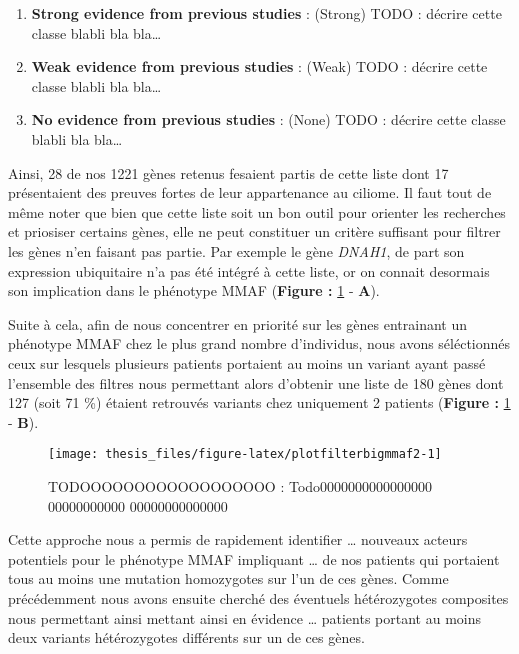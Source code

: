 \documentclass[12pt,twoside]{reedthesis}
\providecommand{\tightlist}{%
  \setlength{\itemsep}{0pt}\setlength{\parskip}{0pt}}
\theoremstyle{definition}
\theoremstyle{definition}
\theoremstyle{remark}
\begin{document}
  \begin{enumerate}
  \def\labelenumi{\arabic{enumi}.}
  \tightlist
  \item
    \textbf{Strong evidence from previous studies} : (Strong) TODO :
    décrire cette classe blabli bla bla\ldots{}\\
  \item
    \textbf{Weak evidence from previous studies} : (Weak) TODO : décrire
    cette classe blabli bla bla\ldots{}\\
  \item
    \textbf{No evidence from previous studies} : (None) TODO : décrire
    cette classe blabli bla bla\ldots{}
  \end{enumerate}
  
  Ainsi, 28 de nos 1221 gènes retenus fesaient partis de cette liste dont
  17 présentaient des preuves fortes de leur appartenance au ciliome. Il
  faut tout de même noter que bien que cette liste soit un bon outil pour
  orienter les recherches et priosiser certains gènes, elle ne peut
  constituer un critère suffisant pour filtrer les gènes n'en faisant pas
  partie. Par exemple le gène \emph{DNAH1}, de part son expression
  ubiquitaire n'a pas été intégré à cette liste, or on connait desormais
  son implication dans le phénotype MMAF (\textbf{Figure :
  }\ref{fig:plotfilterbigmmaf2} - \textbf{A}).
  
  Suite à cela, afin de nous concentrer en priorité sur les gènes
  entrainant un phénotype MMAF chez le plus grand nombre d'individus, nous
  avons séléctionnés ceux sur lesquels plusieurs patients portaient au
  moins un variant ayant passé l'ensemble des filtres nous permettant
  alors d'obtenir une liste de 180 gènes dont 127 (soit 71 \%) étaient
  retrouvés variants chez uniquement 2 patients (\textbf{Figure :
  }\ref{fig:plotfilterbigmmaf2} - \textbf{B}).
  
  \newpage
  
  \begin{figure}
  
  {\centering \texttt{[image: thesis\_files/figure-latex/plotfilterbigmmaf2-1]} 
  
  }
  
  \caption[TODOOOOOOOOOOOOOOOOOO]{TODOOOOOOOOOOOOOOOOOO : Todo0000000000000000 00000000000 00000000000000}\label{fig:plotfilterbigmmaf2}
  \end{figure}
  
  \newpage
  
  Cette approche nous a permis de rapidement identifier \ldots{} nouveaux
  acteurs potentiels pour le phénotype MMAF impliquant \ldots{} de nos
  patients qui portaient tous au moins une mutation homozygotes sur l'un
  de ces gènes. Comme précédemment nous avons ensuite cherché des
  éventuels hétérozygotes composites nous permettant ainsi mettant ainsi
  en évidence \ldots{} patients portant au moins deux variants
  hétérozygotes différents sur un de ces gènes.
  
\end{document}
